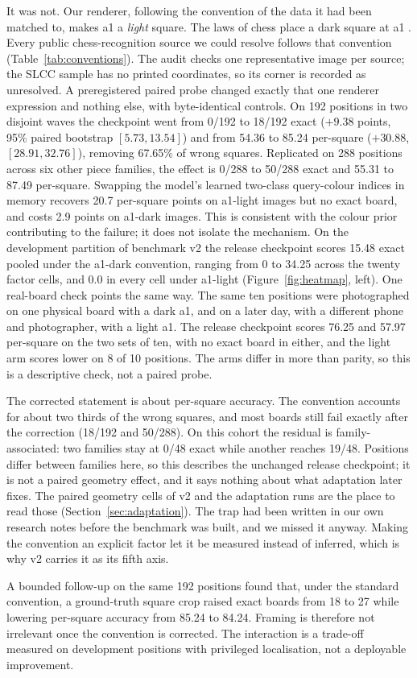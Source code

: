 It was not. Our renderer, following the convention of the data it had been matched to, makes a1 a
\emph{light} square. The laws of chess place a dark square at a1 \cite{fide}. Every public
chess-recognition source we could resolve follows that convention (Table~\ref{tab:conventions}).
The audit checks one representative image per source; the SLCC sample has no printed coordinates,
so its corner is recorded as unresolved. A preregistered paired probe changed exactly that one
renderer expression and nothing else, with byte-identical controls. On 192 positions in two
disjoint waves the checkpoint went from 0/192 to 18/192 exact ($+9.38$ points, 95\% paired bootstrap
$[5.73,13.54]$) and from 54.36 to 85.24 per-square ($+30.88$, $[28.91,32.76]$), removing 67.65\% of
wrong squares. Replicated on 288 positions across six other piece families,
the effect is 0/288 to 50/288 exact and 55.31 to 87.49 per-square. Swapping the model's learned
two-class query-colour indices \cite{chessqueries} in memory recovers 20.7 per-square points on a1-light images
but no exact board, and costs 2.9 points on a1-dark images. This is consistent with the colour
prior contributing to the failure; it does not isolate the mechanism. On the
development partition of benchmark v2 the release checkpoint scores 15.48 exact pooled under the
a1-dark convention, ranging from 0 to 34.25 across the twenty factor cells, and 0.0 in every cell
under a1-light (Figure~\ref{fig:heatmap}, left).
One real-board check points the same way. The same ten positions were photographed on one physical
board with a dark a1, and on a later day, with a different phone and photographer, with a light a1.
The release checkpoint scores 76.25 and 57.97 per-square on the two sets of ten, with no exact
board in either, and the light arm scores lower on 8 of 10 positions. The arms differ in more than
parity, so this is a descriptive check, not a paired probe.

The corrected statement is about per-square accuracy. The convention accounts for about two thirds
of the wrong squares, and most boards still fail exactly after the correction (18/192 and 50/288).
On this cohort the residual is family-associated: two families stay at 0/48 exact while another
reaches 19/48. Positions differ between families here, so this describes the unchanged release
checkpoint; it is not a paired geometry effect, and it says nothing about what adaptation later
fixes. The paired geometry cells of v2 and the adaptation runs are the place to read those
(Section~\ref{sec:adaptation}). The trap had been written in our own research notes before the
benchmark was built, and we missed it anyway. Making the convention an explicit factor let it be
measured instead of inferred, which is why v2 carries it as its fifth axis.

A bounded follow-up on the same 192 positions found that, under the standard convention, a
ground-truth square crop raised exact boards from 18 to 27 while lowering per-square accuracy from
85.24 to 84.24. Framing is therefore not irrelevant once the convention is corrected. The
interaction is a trade-off measured on development positions with privileged localisation, not a
deployable improvement.
